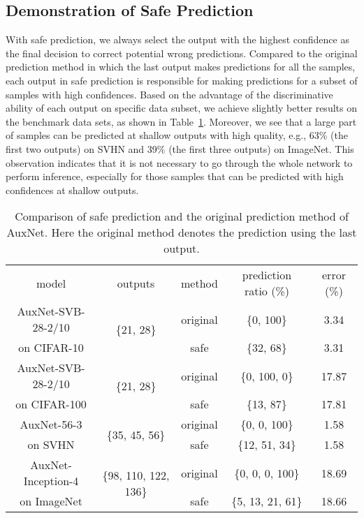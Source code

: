 \documentclass[10pt,onecolumn,letterpaper]{article}
\def\SexyName{AuxNet\xspace}
\begin{document}
\subsection{Demonstration of Safe Prediction}\label{exp:ensemble}

With safe prediction, we always select the output with the highest confidence as the final decision to correct potential wrong predictions.
Compared to the original prediction method in which the last output makes predictions for all the samples,
each output in safe prediction is responsible for making predictions for a subset of samples with high confidences.
Based on the advantage of the discriminative ability of each output on specific data subset, we achieve slightly better results on the benchmark data sets, as shown in Table~\ref{tab:ensemble}.
Moreover, we see that a large part of samples can be predicted at shallow outputs with high quality, e.g., 63\% (the first two outputs) on SVHN and 39\% (the first three outputs) on ImageNet.
This observation indicates that it is not necessary to go through the whole network to perform inference, especially for those samples that can be predicted with high confidences at shallow outputs.


\begin{table}[htbp]
  \centering
  \caption{Comparison of safe prediction and the original prediction method of \SexyName. Here the original method denotes the prediction using the last output.}
    \begin{tabular}{c|c|c|c|c}
    \hline
    \multirow{2}[0]{*}{model} & \multirow{2}[0]{*}{outputs} & \multicolumn{1}{c|}{\multirow{2}[0]{*}{method}} & \multicolumn{1}{c|}{\multirow{2}[0]{*}{prediction ratio (\%)}} & \multicolumn{1}{c}{\multirow{2}[0]{*}{error (\%)}} \\
          &       &       &       &  \\
    \hline
    \SexyName-SVB-28-2/10 & \multirow{2}[0]{*}{\{21, 28\}} & original & \{0, 100\}     & 3.34 \\
    on CIFAR-10      &       & safe & \{32, 68\}     & 3.31 \\
    \hline
    \SexyName-SVB-28-2/10 & \multirow{2}[0]{*}{\{21, 28\}} & original & \{0, 100, 0\}     & 17.87 \\
    on CIFAR-100      &       & safe & \{13, 87\}     & 17.81 \\
    \hline
    \SexyName-56-3 & \multirow{2}[0]{*}{\{35, 45, 56\}} & original & \{0, 0, 100\}     & 1.58 \\
    on SVHN      &       & safe & \{12, 51, 34\}     & 1.58 \\
    \hline
    \SexyName-Inception-4 & \multirow{2}[0]{*}{\{98, 110, 122, 136\}} & original & \{0, 0, 0, 100\}     & 18.69 \\
    on ImageNet      &       & safe & \{5, 13, 21, 61\}     & 18.66 \\
    \hline
    \end{tabular}%
  \label{tab:ensemble}%
\end{table}%
\end{document}
